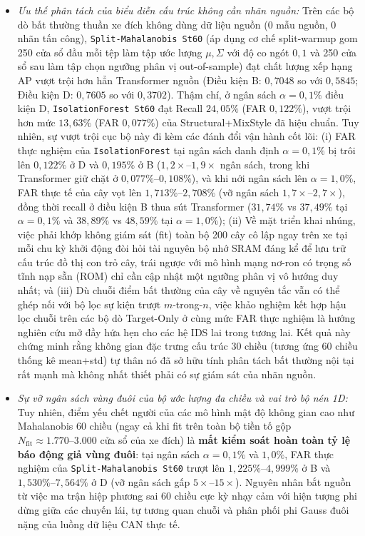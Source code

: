 \documentclass[12pt, a4paper, reqno, oneside]{book}
\DeclareRobustCommand{\code}[1]{\nolinkurl{#1}}
\begin{document}
\begin{itemize}
    \item \textit{Ưu thế phân tách của biểu diễn cấu trúc không cần nhãn nguồn:} Trên các bộ dò bất thường thuần xe đích không dùng dữ liệu nguồn (0 mẫu nguồn, 0 nhãn tấn công), \code{Split-Mahalanobis St60} (áp dụng cơ chế split-warmup gom 250 cửa sổ đầu mỗi tệp làm tập ước lượng $\mu, \Sigma$ với độ co ngót $0{,}1$ và 250 cửa sổ sau làm tập chọn ngưỡng phân vị out-of-sample) đạt chất lượng xếp hạng AP vượt trội hơn hẳn Transformer nguồn (Điều kiện B: $0{,}7048$ so với $0{,}5845$; Điều kiện D: $0{,}7605$ so với $0{,}3702$). Thậm chí, ở ngân sách $\alpha=0{,}1\%$ điều kiện D, \code{IsolationForest St60} đạt Recall $24{,}05\%$ (FAR $0{,}122\%$), vượt trội hơn mức $13{,}63\%$ (FAR $0{,}077\%$) của Structural+MixStyle đã hiệu chuẩn. Tuy nhiên, sự vượt trội cục bộ này đi kèm các đánh đổi vận hành cốt lõi: (i) FAR thực nghiệm của \code{IsolationForest} tại ngân sách danh định $\alpha=0{,}1\%$ bị trôi lên $0{,}122\%$ ở D và $0{,}195\%$ ở B ($1{,}2\times\text{--}1{,}9\times$ ngân sách, trong khi Transformer giữ chặt ở $0{,}077\%\text{--}0{,}108\%$), và khi nới ngân sách lên $\alpha=1{,}0\%$, FAR thực tế của cây vọt lên $1{,}713\%\text{--}2{,}708\%$ (vỡ ngân sách $1{,}7\times\text{--}2{,}7\times$), đồng thời recall ở điều kiện B thua sút Transformer ($31{,}74\%$ vs $37{,}49\%$ tại $\alpha=0{,}1\%$ và $38{,}89\%$ vs $48{,}59\%$ tại $\alpha=1{,}0\%$); (ii) Về mặt triển khai nhúng, việc phải khớp không giám sát (fit) toàn bộ 200 cây cô lập ngay trên xe tại mỗi chu kỳ khởi động đòi hỏi tài nguyên bộ nhớ SRAM đáng kể để lưu trữ cấu trúc đồ thị con trỏ cây, trái ngược với mô hình mạng nơ-ron có trọng số tĩnh nạp sẵn (ROM) chỉ cần cập nhật một ngưỡng phân vị vô hướng duy nhất; và (iii) Dù chuỗi điểm bất thường của cây về nguyên tắc vẫn có thể ghép nối với bộ lọc sự kiện trượt $m$-trong-$n$, việc khảo nghiệm kết hợp hậu lọc chuỗi trên các bộ dò Target-Only ở cùng mức FAR thực nghiệm là hướng nghiên cứu mở đầy hứa hẹn cho các hệ IDS lai trong tương lai. Kết quả này chứng minh rằng không gian đặc trưng cấu trúc 30 chiều (tương ứng 60 chiều thống kê mean+std) tự thân nó đã sở hữu tính phân tách bất thường nội tại rất mạnh mà không nhất thiết phải có sự giám sát của nhãn nguồn.
    \item \textit{Sự vỡ ngân sách vùng đuôi của bộ ước lượng đa chiều và vai trò bộ nén 1D:} Tuy nhiên, điểm yếu chết người của các mô hình mật độ không gian cao như Mahalanobis 60 chiều (ngay cả khi fit trên toàn bộ tiền tố gộp $N_{\text{fit}} \approx 1.770\text{--}3.000$ cửa sổ của xe đích) là \textbf{mất kiểm soát hoàn toàn tỷ lệ báo động giả vùng đuôi}: tại ngân sách $\alpha=0{,}1\%$ và $1{,}0\%$, FAR thực nghiệm của \code{Split-Mahalanobis St60} trượt lên $1{,}225\%\text{--}4{,}999\%$ ở B và $1{,}530\%\text{--}7{,}564\%$ ở D (vỡ ngân sách gấp $5\times\text{--}15\times$). Nguyên nhân bắt nguồn từ việc ma trận hiệp phương sai 60 chiều cực kỳ nhạy cảm với hiện tượng phi dừng giữa các chuyến lái, tự tương quan chuỗi và phân phối phi Gauss đuôi nặng của luồng dữ liệu CAN thực tế.

\end{itemize}
\end{document}
